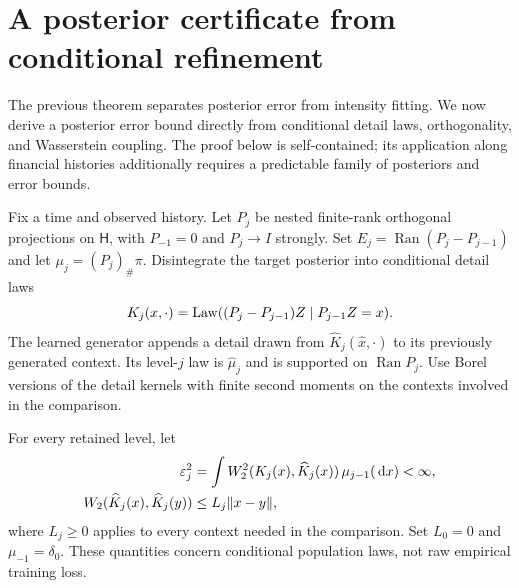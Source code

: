 \section{A posterior certificate from conditional refinement}\label{sec:refine}
The previous theorem separates posterior error from intensity fitting. We now derive a posterior error bound directly from conditional detail laws, orthogonality, and Wasserstein coupling. The proof below is self-contained; its application along financial histories additionally requires a predictable family of posteriors and error bounds.

Fix a time and observed history. Let $P_j$ be nested finite-rank orthogonal projections on $\mathsf H$, with $P_{-1}=0$ and $P_j\to I$ strongly. Set
$E_j=\operatorname{Ran}(P_j-P_{j-1})$ and let $\mu_j=(P_j)_\#\pi$.
Disintegrate the target posterior into conditional detail laws
\[
 K_j(x,\cdot)=\operatorname{Law}((P_j-P_{j-1})Z\mid P_{j-1}Z=x).
\]
The learned generator appends a detail drawn from $\widehat K_j(\widehat x,\cdot)$ to its previously generated context. Its level-$j$ law is $\widehat\mu_j$ and is supported on $\operatorname{Ran}P_j$. Use Borel versions of the detail kernels with finite second moments on the contexts involved in the comparison.

\begin{assumption}\label{ass:refine}
For every retained level, let
\begin{align}
 \varepsilon_j^2&=\int W_2^2(K_j(x),\widehat K_j(x))\,\mu_{j-1}(\,\mathrm d x)<\infty,
 \label{eq:eps}\\
 W_2(\widehat K_j(x),\widehat K_j(y))&\le L_j\|x-y\|,
 \label{eq:detail-lip}
\end{align}
where $L_j\ge0$ applies to every context needed in the comparison. Set $L_0=0$ and $\mu_{-1}=\delta_0$. These quantities concern conditional population laws, not raw empirical training loss.
\end{assumption}


